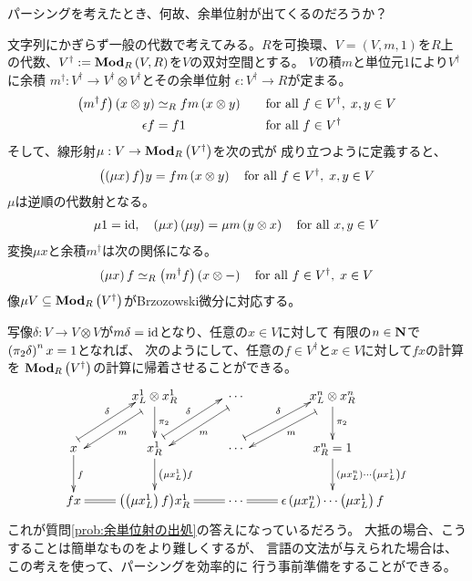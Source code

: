 {	\begin{problem}[余単位射の出処]\label{prob:余単位射の出処} %
		パーシングを考えたとき、何故、余単位射が出てくるのだろうか？
	\end{problem} %

	文字列にかぎらず一般の代数で考えてみる。$R$を可換環、$V=(V,m,1)$を$R$上
	の代数、$V^\dag:={\mathbf{{Mod}}}_R\left({V,R}\right)$を$V$の双対空間とする。
	$V$の積$m$と単位元$1$により$V^\dag$に余積
	$m^\dag:V^\dag\to V^\dag\otimes V^\dag$とその余単位射
	$\epsilon:V^\dag\to R$が定まる。
	\begin{alignat*}{2}
		\left({m^\dag f}\right)\left({x\otimes y}\right) &\simeq_R fm\left({x\otimes y}\right) 
		&\quad&\text{for all } f\in V^\dag,\; x,y\in V \\
		\epsilon f &= f1 &\quad&\text{for all } f\in V^\dag
	\end{alignat*}
	そして、線形射$\mu:V\to{\ensuremath{\mathbf{{Mod}}}}_R\left({V^\dag}\right)$を次の式が
	成り立つように定義すると、
	\begin{equation*}\begin{split}
		\bigl({\left({\mu x}\right)f}\bigr) y = fm\left({x\otimes y}\right)
		\quad\text{for all } f\in V^\dag,\; x,y\in V
	\end{split}\end{equation*}
	$\mu$は逆順の代数射となる。
	\begin{equation*}\begin{split}
		\mu1 = {\operatorname{id}},\quad \left({\mu x}\right)\left({\mu y}\right) = \mu m\left({y\otimes x}\right)
		\quad\text{for all } x,y\in V
	\end{split}\end{equation*}
	変換$\mu x$と余積$m^\dag$は次の関係になる。
	\begin{equation*}\begin{split}
		\left({\mu x}\right)f \simeq_R \left({m^\dag f}\right)\left({x\otimes-}\right)
		\quad\text{for all } f\in V^\dag,\; x\in V
	\end{split}\end{equation*}
	像$\mu V\subseteq{\ensuremath{\mathbf{{Mod}}}}_R\left({V^\dag}\right)$がBrzozowski微分に対応する。

	写像$\delta:V\to V\otimes V$が$m\delta={\operatorname{id}}$となり、任意の$x\in V$に対して
	有限の$n\in\mathbf{N}$で$\left({\pi_2\delta}\right)^nx=1$となれば、
	次のようにして、任意の$f\in V^\dag$と$x\in V$に対して$fx$の計算を
	${\mathbf{{Mod}}}_R\left({V^\dag}\right)$の計算に帰着させることができる。
	\begin{equation*}\xymatrix{
		& x_L^1\otimes x_R^1 \ar@<1ex>@{|->}[ld]^{m} \ar[d]^{\pi_2}
		& \cdots \ar@<1ex>@{|->}[ld]^{m} 
		& x_L^n\otimes x_R^n \ar@<1ex>@{|->}[ld]^{m} \ar[d]^{\pi_2} \\
		x \ar@<1ex>@{|->}[ru]^\delta \ar[d]^f
		& x_R^1 \ar[d]^{\lr{\mu x_L^1}f} \ar@<1ex>@{|->}[ru]^\delta
		& \cdots \ar@<1ex>@{|->}[ru]^\delta
		& x_R^n = 1 \ar[d]^{\lr{\mu x_L^n}\cdots\lr{\mu x_L^1}f} \\
		fx \ar@{=}[r] & \glr{\lr{\mu x_L^1}f}x_R^1 \ar@{=}[r]
		& \cdots \ar@{=}[r]
		& \epsilon\lr{\mu x_L^n}\cdots\lr{\mu x_L^1}f
	}\end{equation*}
	これが質問\ref{prob:余単位射の出処}の答えになっているだろう。
	大抵の場合、こうすることは簡単なものをより難しくするが、
	言語の文法が与えられた場合は、この考えを使って、パーシングを効率的に
	行う事前準備をすることができる。

}
